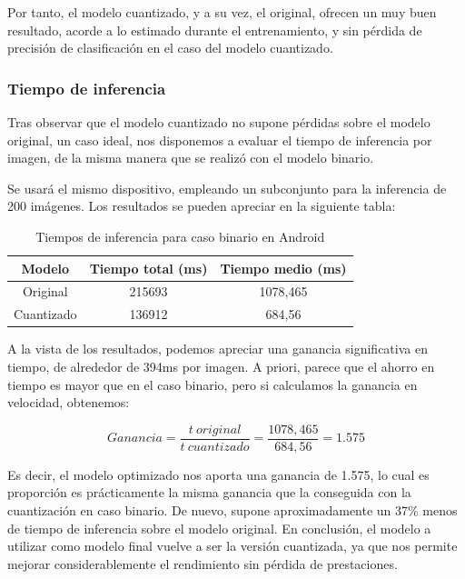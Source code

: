 Por tanto, el modelo cuantizado, y a su vez, el original, ofrecen un muy buen resultado, acorde a lo estimado durante el entrenamiento, y sin pérdida de precisión de clasificación en el caso del modelo cuantizado. 

\subsubsection{Tiempo de inferencia}

Tras observar que el modelo cuantizado no supone pérdidas sobre el modelo original, un caso ideal, nos disponemos a evaluar el tiempo de inferencia por imagen, de la misma manera que se realizó con el modelo binario.

Se usará el mismo dispositivo, empleando un subconjunto para la inferencia de 200 imágenes. Los resultados se pueden apreciar en la siguiente tabla:

\begin{table}[H]
	\centering
	\begin{tabular}{|c|c|c|}
		\hline
		Modelo & Tiempo total (ms) & Tiempo medio (ms) \\ \hline
		Original & 215693 & 1078,465	 \\ \hline
		Cuantizado & 136912 & 684,56 \\ \hline
	\end{tabular}
	\caption{Tiempos de inferencia para caso binario en Android}
	\label{infbin}
\end{table}

A la vista de los resultados, podemos apreciar una ganancia significativa en tiempo, de alrededor de 394ms por imagen. A priori, parece que el ahorro en tiempo es mayor que en el caso binario, pero si calculamos la ganancia en velocidad, obtenemos:

$$Ganancia = \frac{t\ original}{t\ cuantizado} = \frac{1078,465}{684,56} = 1.575$$

Es decir, el modelo optimizado nos aporta una ganancia de 1.575, lo cual es proporción es prácticamente la misma ganancia que la conseguida con la cuantización en caso binario. De nuevo, supone aproximadamente un 37\% menos de tiempo de inferencia sobre el modelo original. 
En conclusión, el modelo a utilizar como modelo final vuelve a ser la versión cuantizada, ya que nos permite mejorar considerablemente el rendimiento sin pérdida de prestaciones.